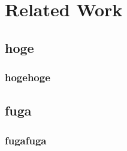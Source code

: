 \section{Related Work}
\subsection{hoge}
\subsubsection{hogehoge}
\subsection{fuga}
\subsubsection{fugafuga}